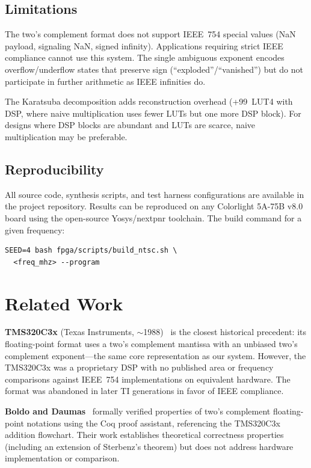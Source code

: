 \documentclass[10pt,twocolumn]{article}
\begin{document}
\subsection{Limitations}

The two's complement format does not support IEEE~754 special values
(NaN payload, signaling NaN, signed infinity).  Applications requiring
strict IEEE compliance cannot use this system.  The single ambiguous
exponent encodes overflow/underflow states that preserve sign
(``exploded''/``vanished'') but do not participate in further arithmetic
as IEEE infinities do.

The Karatsuba decomposition adds reconstruction overhead (+99~LUT4 with
DSP, where naive multiplication uses fewer LUTs but one more DSP block).
For designs where DSP blocks are abundant and LUTs are scarce, naive
multiplication may be preferable.

\subsection{Reproducibility}

All source code, synthesis scripts, and test harness configurations are
available in the project repository.  Results can be reproduced on any
Colorlight 5A-75B v8.0 board using the open-source Yosys/nextpnr
toolchain.  The build command for a given frequency:
\begin{verbatim}
SEED=4 bash fpga/scripts/build_ntsc.sh \
  <freq_mhz> --program
\end{verbatim}

\section{Related Work}
\label{sec:related}

\textbf{TMS320C3x} (Texas Instruments, $\sim$1988)~\cite{tms320c3x} is
the closest historical precedent: its floating-point format uses a two's
complement mantissa with an unbiased two's complement exponent---the same
core representation as our system.  However, the TMS320C3x was a
proprietary DSP with no published area or frequency comparisons against
IEEE~754 implementations on equivalent hardware.  The format was
abandoned in later TI generations in favor of IEEE compliance.

\textbf{Boldo and Daumas}~\cite{boldo2003} formally verified properties
of two's complement floating-point notations using the Coq proof
assistant, referencing the TMS320C3x addition flowchart.  Their work
establishes theoretical correctness properties (including an extension
of Sterbenz's theorem) but does not address hardware implementation or
comparison.
\end{document}
